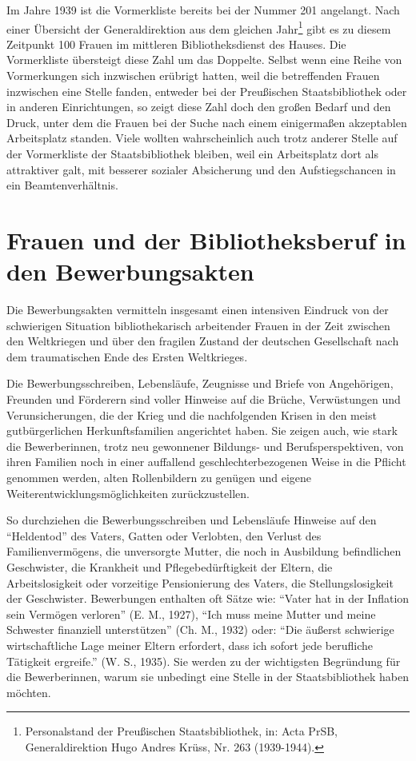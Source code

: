 \documentclass[a4paper,
fontsize=11pt,
oneside,
numbers=noperiodatend,
parskip=half-,
bibliography=totoc,
final
]{scrartcl}
\begin{document}
Im Jahre 1939 ist die Vormerkliste bereits bei der Nummer 201 angelangt.
Nach einer Übersicht der Generaldirektion aus dem gleichen
Jahr\footnote{Personalstand der Preußischen Staatsbibliothek, in: Acta
  PrSB, Generaldirektion Hugo Andres Krüss, Nr. 263 (1939-1944).} gibt
es zu diesem Zeitpunkt 100 Frauen im mittleren Bibliotheksdienst des
Hauses. Die Vormerkliste übersteigt diese Zahl um das Doppelte. Selbst
wenn eine Reihe von Vormerkungen sich inzwischen erübrigt hatten, weil
die betreffenden Frauen inzwischen eine Stelle fanden, entweder bei der
Preußischen Staatsbibliothek oder in anderen Einrichtungen, so zeigt
diese Zahl doch den großen Bedarf und den Druck, unter dem die Frauen
bei der Suche nach einem einigermaßen akzeptablen Arbeitsplatz standen.
Viele wollten wahrscheinlich auch trotz anderer Stelle auf der
Vormerkliste der Staatsbibliothek bleiben, weil ein Arbeitsplatz dort
als attraktiver galt, mit besserer sozialer Absicherung und den
Aufstiegschancen in ein Beamtenverhältnis.~

\section*{Frauen und der Bibliotheksberuf in den
Bewerbungsakten}\label{frauen-und-der-bibliotheksberuf-in-den-bewerbungsakten}

Die Bewerbungsakten vermitteln insgesamt einen intensiven Eindruck von
der schwierigen Situation bibliothekarisch arbeitender Frauen in der
Zeit zwischen den Weltkriegen und über den fragilen Zustand der
deutschen Gesellschaft nach dem traumatischen Ende des Ersten
Weltkrieges.

Die Bewerbungsschreiben, Lebensläufe, Zeugnisse und Briefe von
Angehörigen, Freunden und Förderern sind voller Hinweise auf die Brüche,
Verwüstungen und Verunsicherungen, die der Krieg und die nachfolgenden
Krisen in den meist gutbürgerlichen Herkunftsfamilien angerichtet haben.
Sie zeigen auch, wie stark die Bewerberinnen, trotz neu gewonnener
Bildungs- und Berufsperspektiven, von ihren Familien noch in einer
auffallend geschlechterbezogenen Weise in die Pflicht genommen werden,
alten Rollenbildern zu genügen und eigene
Weiterentwicklungsmöglichkeiten zurückzustellen.

So durchziehen die Bewerbungsschreiben und Lebensläufe Hinweise auf den
\enquote{Heldentod} des Vaters, Gatten oder Verlobten, den Verlust des
Familienvermögens, die unversorgte Mutter, die noch in Ausbildung
befindlichen Geschwister, die Krankheit und Pflegebedürftigkeit der
Eltern, die Arbeitslosigkeit oder vorzeitige Pensionierung des Vaters,
die Stellungslosigkeit der Geschwister. Bewerbungen enthalten oft Sätze
wie: \enquote{Vater hat in der Inflation sein Vermögen verloren} (E. M.,
1927), \enquote{Ich muss meine Mutter und meine Schwester finanziell
unterstützen} (Ch. M., 1932) oder: \enquote{Die äußerst schwierige
wirtschaftliche Lage meiner Eltern erfordert, dass ich sofort jede
berufliche Tätigkeit ergreife.} (W. S., 1935). Sie werden zu der
wichtigsten Begründung für die Bewerberinnen, warum sie unbedingt eine
Stelle in der Staatsbibliothek haben möchten.
\end{document}

